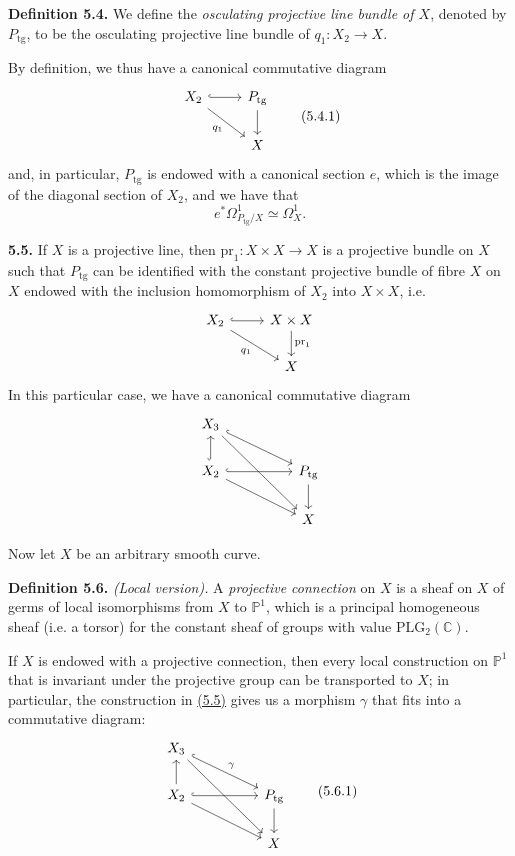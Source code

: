 \documentclass{report}
\newenvironment{rmenv}[1]
  {\phantomsection\par\medskip\noindent\textbf{#1.}\rmfamily}
  {\medskip}
\newcommand{\PP}{\mathbb{P}}
\newcommand{\CC}{\mathbb{C}}
\newcommand{\pr}{\mathrm{pr}}
\newcommand{\tg}{\mathrm{tg}}
\newcommand{\oldpage}[1]{\marginpar{\footnotesize$\Big\vert$ \textit{p.~#1}}}
\begin{document}
\begin{rmenv}{Definition 5.4}
\label{I.5.4}
  We define the \emph{osculating projective line bundle of $X$}, denoted by $P_\tg$, to be the osculating projective line bundle of $q_1\colon X_2\to X$.
\end{rmenv}

By definition, we thus have a canonical commutative diagram
\[
\label{I.5.4.1}
  \begin{tikzcd}
    X_2 \rar[hook] \drar[swap,"q_1"]
    & P_\tg \dar
  \\& X
  \end{tikzcd}
\tag{5.4.1}
\]
and, in particular, $P_\tg$ is endowed with a canonical section $e$, which is the image of the diagonal section of $X_2$, and we have that
\[
\label{I.5.4.2}
  e^*\Omega_{P_\tg/X}^1 \simeq \Omega_X^1.
\tag{5.4.2}
\]

\begin{rmenv}{5.5}
\label{I.5.5}
  If $X$ is a projective line, then $\pr_1\colon X\times X\to X$ is a projective bundle on $X$ such that $P_\tg$ can be identified with the constant projective bundle of fibre $X$ on $X$ endowed with the inclusion homomorphism of $X_2$ into $X\times X$, i.e.
  \[
    \begin{tikzcd}
      X_2 \rar[hook] \drar[swap,"q_1"]
      & X\times X \dar["\pr_1"]
    \\& X
    \end{tikzcd}
  \]
\oldpage{31}
  In this particular case, we have a canonical commutative diagram
  \[
    \begin{tikzcd}[column sep=huge]
      X_3 \drar[hook] \ar[ddr]
    \\X_2 \uar[hook] \rar[hook] \drar
      & P_\tg \dar
    \\& X
    \end{tikzcd}
  \]
\end{rmenv}

Now let $X$ be an arbitrary smooth curve.

\begin{rmenv}{Definition 5.6}
\label{I.5.6}
  \emph{(Local version).}
  A \emph{projective connection} on $X$ is a sheaf on $X$ of germs of local isomorphisms from $X$ to $\PP^1$, which is a principal homogeneous sheaf (i.e. a torsor) for the constant sheaf of groups with value $\mathrm{PLG}_2(\CC)$.
\end{rmenv}

If $X$ is endowed with a projective connection, then every local construction on $\PP^1$ that is invariant under the projective group can be transported to $X$;
in particular, the construction in \hyperref[I.5.5]{(5.5)} gives us a morphism $\gamma$ that fits into a commutative diagram:
\[
\label{I.5.6.1}
  \begin{tikzcd}[column sep=huge]
    X_3 \drar[hook,"\gamma"] \ar[ddr]
  \\X_2 \uar \rar[hook] \drar
    & P_\tg \dar
  \\& X
  \end{tikzcd}
\tag{5.6.1}
\]
\end{document}
